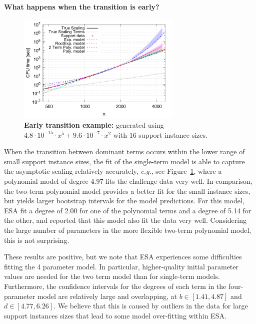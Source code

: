 \documentclass[aic]{iosart2x}
\newcommand{\eg}{\emph{e.g.}}
\newcommand{\note}[1]{\textcolor{green}{[Note: #1]}}
\renewcommand{\note}[1]{}
\begin{document}
\textbf{What happens when the transition is early?}
\begin{figure}[t]
\centering
\includegraphics[width=0.7\textwidth]{fittedModels-2-5-14-16s.pdf}
\caption{\textbf{Early transition example:} generated using $4.8\cdot 10^{-15} \cdot x^5 + 9.6\cdot 10^{-7} \cdot x^2$ with 16 support instance sizes. \note{We'll need to decide whether or not we want colour figures. They cost extra, but you have to contact them to obtain a quote for the price. I think for these three figures in particular it would be nearly impossible to understand them without colour (and I'm not confident that I could make them legible without). HH: We can decide this once the paper has been accepted. Leave as colour figures for now.}}
\label{fig:AA-competing-2-5-14-16s}
\end{figure}
When the transition between dominant terms occurs within the lower range of small support instance sizes, the fit of the single-term model is able to capture the asymptotic scaling relatively accurately, \eg{}, see Figure~\ref{fig:AA-competing-2-5-14-16s}, where a polynomial model of degree 4.97 fits the challenge data very well. In comparison, the two-term polynomial model provides a better fit for the small instance sizes, but yields larger bootstrap intervals for the model predictions. For this model, ESA fit a degree of 2.00 for one of the polynomial terms and a degree of 5.14 for the other, and reported that this model also fit the data very well. 
Considering the large number of parameters in the more flexible two-term polynomial model, this is not surprising.

These results are positive, but we note that ESA experiences some difficulties fitting the 4 parameter model. 
In particular, higher-quality initial parameter values are needed for the two term model than for single-term models. Furthermore, the confidence intervals for the degrees of each term in the four-parameter model are relatively large and overlapping, at $b \in [1.41,4.87]$ and $d \in [4.77,6.26]$. 
We believe that this is caused by outliers in the data for large support instances sizes that lead to some model over-fitting within ESA.
\end{document}
